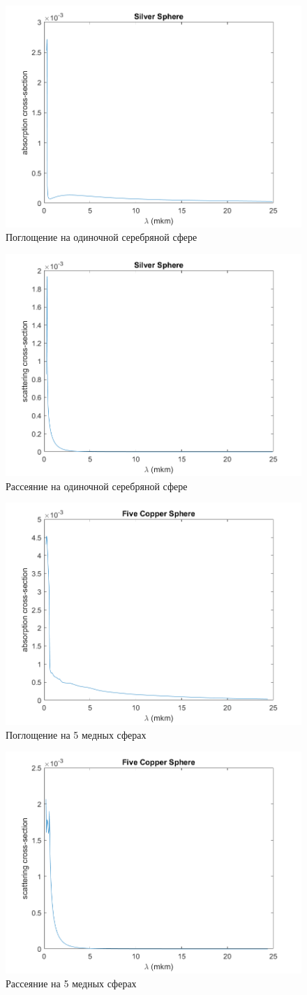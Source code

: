 \begin{figure}[h!]
	\centering
	\includegraphics[width=0.5\linewidth]{singleSilverSphereAbsorptionSection}
	\caption{Поглощение на одиночной серебряной сфере}
	\label{fig:singleSilverSphereAbsorptionSection}
\end{figure}
\begin{figure}[h!]
	\centering
	\includegraphics[width=0.5\linewidth]{singleSilverSphereCrossSection}
	\caption{Рассеяние на одиночной серебряной сфере}
	\label{fig:singleSilverSphereCrossSection}
\end{figure}
\begin{figure}[h!]
	\centering
	\includegraphics[width=0.5\linewidth]{fiveCopperSphereAbsorptionSection}
	\caption{Поглощение на 5 медных сферах}
	\label{fig:fiveCopperSphereAbsorptionSection}
\end{figure}
\begin{figure}[h!]
	\centering
	\includegraphics[width=0.5\linewidth]{fiveCopperSphereCrossSection}
	\caption{Рассеяние на 5 медных сферах}
	\label{fig:fiveCopperSphereCrossSection}
\end{figure} 
